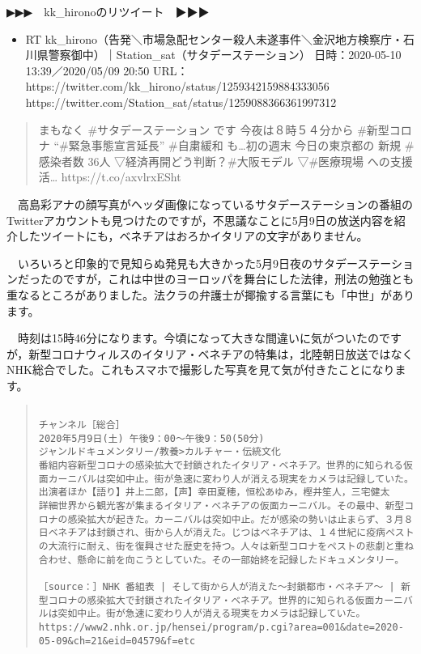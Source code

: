 \documentclass[]{ltjarticle}
\providecommand{\tightlist}{%
  \setlength{\itemsep}{0pt}\setlength{\parskip}{0pt}}
\begin{document}
▶▶▶　kk\_hironoのリツイート　▶▶▶

\begin{itemize}
\tightlist
\item
  RT
  kk\_hirono（告発＼市場急配センター殺人未遂事件＼金沢地方検察庁・石川県警察御中）｜Station\_sat（サタデーステーション）
  日時：2020-05-10 13:39／2020/05/09 20:50 URL：
  https://twitter.com/kk\_hirono/status/1259342159884333056
  https://twitter.com/Station\_sat/status/1259088366361997312
\end{itemize}

\begin{quote}
まもなく \#サタデーステーション です 今夜は８時５４分から \#新型コロナ
``\#緊急事態宣言延長'' \#自粛緩和 も\ldots{}初の週末 今日の東京都の 新規
\#感染者数 36人 ▽経済再開どう判断？\#大阪モデル ▽\#医療現場
への支援活\ldots{} https://t.co/axvlrxESht
\end{quote}

　高島彩アナの顔写真がヘッダ画像になっているサタデーステーションの番組のTwitterアカウントも見つけたのですが，不思議なことに5月9日の放送内容を紹介したツイートにも，ベネチアはおろかイタリアの文字がありません。

　いろいろと印象的で見知らぬ発見も大きかった5月9日夜のサタデーステーションだったのですが，これは中世のヨーロッパを舞台にした法律，刑法の勉強とも重なるところがありました。法クラの弁護士が揶揄する言葉にも「中世」があります。

　時刻は15時46分になります。今頃になって大きな間違いに気がついたのですが，新型コロナウィルスのイタリア・ベネチアの特集は，北陸朝日放送ではなくNHK総合でした。これもスマホで撮影した写真を見て気が付きたことになります。

\begingroup\fontsize{9pt}{10pt}\selectfont
\begin{quote}
\begin{verbatim}

チャンネル［総合］
2020年5月9日(土) 午後9：00～午後9：50(50分)
ジャンルドキュメンタリー/教養>カルチャー・伝統文化
番組内容新型コロナの感染拡大で封鎖されたイタリア・ベネチア。世界的に知られる仮面カーニバルは突如中止。街が急速に変わり人が消える現実をカメラは記録していた。
出演者ほか【語り】井上二郎，【声】幸田夏穂，恒松あゆみ，樫井笙人，三宅健太
詳細世界から観光客が集まるイタリア・ベネチアの仮面カーニバル。その最中、新型コロナの感染拡大が起きた。カーニバルは突如中止。だが感染の勢いは止まらず、３月８日ベネチアは封鎖され、街から人が消えた。じつはベネチアは、１４世紀に疫病ペストの大流行に耐え、街を復興させた歴史を持つ。人々は新型コロナをペストの悲劇と重ね合わせ、懸命に前を向こうとしていた。その一部始終を記録したドキュメンタリー。

［source：］NHK 番組表 | そして街から人が消えた～封鎖都市・ベネチア～ | 新型コロナの感染拡大で封鎖されたイタリア・ベネチア。世界的に知られる仮面カーニバルは突如中止。街が急速に変わり人が消える現実をカメラは記録していた。 https://www2.nhk.or.jp/hensei/program/p.cgi?area=001&date=2020-05-09&ch=21&eid=04579&f=etc

\end{verbatim}
\end{quote}\endgroup
\end{document}
